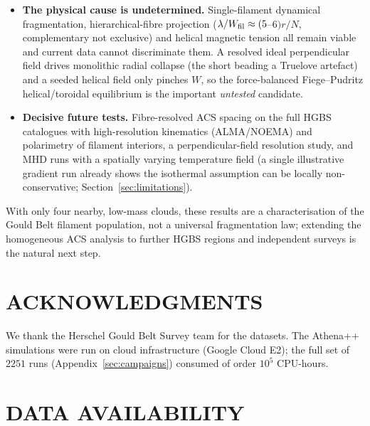 \documentclass[usenatbib,twoside,twocolumn]{mnras}
\begin{document}
\begin{itemize}
    \item \textbf{The physical cause is undetermined.} Single-filament dynamical fragmentation, hierarchical-fibre projection ($\lambda/W_{\rm fil}\approx(5$--$6)r/N$, complementary not exclusive) and helical magnetic tension all remain viable and current data cannot discriminate them. A resolved ideal perpendicular field drives monolithic radial collapse (the short beading a Truelove artefact) and a seeded helical field only pinches $W$, so the force-balanced Fiege--Pudritz helical/toroidal equilibrium is the important \emph{untested} candidate.
    \item \textbf{Decisive future tests.} Fibre-resolved ACS spacing on the full HGBS catalogues with high-resolution kinematics (ALMA/NOEMA) and polarimetry of filament interiors, a perpendicular-field resolution study, and MHD runs with a spatially varying temperature field (a single illustrative gradient run already shows the isothermal assumption can be locally non-conservative; Section~\ref{sec:limitations}).
    \end{itemize}

\smallskip\noindent With only four nearby, low-mass clouds, these results are a characterisation of the Gould Belt filament population, not a universal fragmentation law; extending the homogeneous ACS analysis to further HGBS regions and independent surveys is the natural next step.

\section*{ACKNOWLEDGMENTS}

We thank the Herschel Gould Belt Survey team for the datasets. The Athena++ simulations were run on cloud infrastructure (Google Cloud E2); the full set of $2251$ runs (Appendix~\ref{sec:campaigns}) consumed of order $10^5$ CPU-hours.

\section*{DATA AVAILABILITY}
\end{document}
